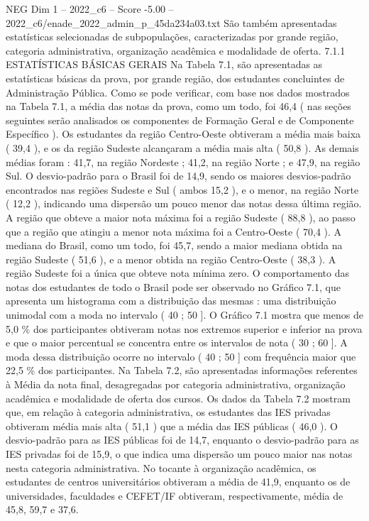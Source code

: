 \begin{textsample}{NEG Dim 1 – 2022\_c6 – Score -5.00 – 2022\_c6/enade\_2022\_admin\_p\_45da234a03.txt}
São também apresentadas estatísticas selecionadas de subpopulações, caracterizadas por grande região, categoria administrativa, organização acadêmica e modalidade de oferta. 7.1.1 ESTATÍSTICAS BÁSICAS GERAIS Na Tabela 7.1, são apresentadas as estatísticas básicas da prova, por grande região, dos estudantes concluintes de Administração Pública.
Como se pode verificar, com base nos dados mostrados na Tabela 7.1, a média das notas da prova, como um todo, foi 46,4 ( nas seções seguintes serão analisados os componentes de Formação Geral e de Componente Específico ).
Os estudantes da região Centro-Oeste obtiveram a média mais baixa ( 39,4 ), e os da região Sudeste alcançaram a média mais alta ( 50,8 ).
As demais médias foram : 41,7, na região Nordeste ; 41,2, na região Norte ; e 47,9, na região Sul.
O desvio-padrão para o Brasil foi de 14,9, sendo os maiores desvios-padrão encontrados nas regiões Sudeste e Sul ( ambos 15,2 ), e o menor, na região Norte ( 12,2 ), indicando uma dispersão um pouco menor das notas dessa última região.
A região que obteve a maior nota máxima foi a região Sudeste ( 88,8 ), ao passo que a região que atingiu a menor nota máxima foi a Centro-Oeste ( 70,4 ).
A mediana do Brasil, como um todo, foi 45,7, sendo a maior mediana obtida na região Sudeste ( 51,6 ), e a menor obtida na região Centro-Oeste ( 38,3 ).
A região Sudeste foi a única que obteve nota mínima zero.
O comportamento das notas dos estudantes de todo o Brasil pode ser observado no Gráfico 7.1, que apresenta um histograma com a distribuição das mesmas : uma distribuição unimodal com a moda no intervalo ( 40 ; 50 ].
O Gráfico 7.1 mostra que menos de 5,0 \% dos participantes obtiveram notas nos extremos superior e inferior na prova e que o maior percentual se concentra entre os intervalos de nota ( 30 ; 60 ].
A moda dessa distribuição ocorre no intervalo ( 40 ; 50 ] com frequência maior que 22,5 \% dos participantes.
Na Tabela 7.2, são apresentadas informações referentes à Média da nota final, desagregadas por categoria administrativa, organização acadêmica e modalidade de oferta dos cursos.
Os dados da Tabela 7.2 mostram que, em relação à categoria administrativa, os estudantes das IES privadas obtiveram média mais alta ( 51,1 ) que a média das IES públicas ( 46,0 ).
O desvio-padrão para as IES públicas foi de 14,7, enquanto o desvio-padrão para as IES privadas foi de 15,9, o que indica uma dispersão um pouco maior nas notas nesta categoria administrativa.
No tocante à organização acadêmica, os estudantes de centros universitários obtiveram a média de 41,9, enquanto os de universidades, faculdades e CEFET/IF obtiveram, respectivamente, média de 45,8, 59,7 e 37,6.

\end{textsample}

